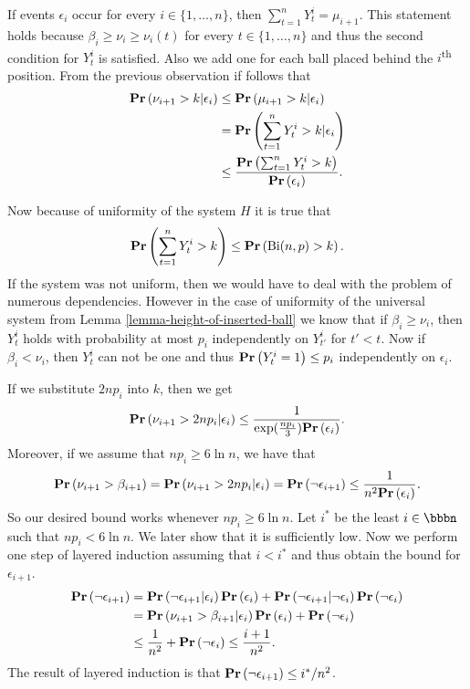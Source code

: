 \documentclass[runningheads,a4paper]{llncs}
\begin{document}
If events $\epsilon_i$ occur for every $i \in \{1, \dots, n\}$, then $\sum_{t = 1}^{n} Y_t^i = \mu_{i + 1}$. This statement holds because $\beta_i \geq \nu_i \geq \nu_i(t)$ for every $t \in \{1, \dots, n\}$ and thus the second condition for $Y_t^i$ is satisfied. Also we add one for each ball placed behind the $i$\textsuperscript{th} position. 
From the previous observation if follows that
\[
\begin{split}
\mathbf{Pr}\left(\nu_{i + 1} > k | \epsilon_i\right) 
	& \leq \mathbf{Pr}\left(\mu_{i + 1} > k | \epsilon_i\right) \\
	& = \mathbf{Pr}\left(\displaystyle\sum_{t = 1}^{n} Y_t^{i} > k | \epsilon_i\right) \\
	& \leq \frac{\mathbf{Pr}\left(\sum_{t = 1}^{n} Y_t^{i} > k\right)}{\mathbf{Pr}\left(\epsilon_i\right)}. \\
\end{split}
\]

Now because of uniformity of the system $H$ it is true that $$\mathbf{Pr}\left(\sum_{t = 1}^{n} Y_t^i > k\right) \leq \mathbf{Pr}\left(\mathrm{Bi}(n, p) > k\right).$$ If the system was not uniform, then we would have to deal with the problem of numerous dependencies. However in the case of uniformity of the universal system from Lemma \ref{lemma-height-of-inserted-ball} we know that if $\beta_i \geq \nu_i$, then $Y_t^i$ holds with probability at most $p_i$ independently on $Y_{t'}^i$ for $t' < t$. Now if $\beta_i < \nu_i$, then $Y_t^i$ can not be one and thus $\mathbf{Pr}\left(Y_t^i = 1\right) \leq p_i$ independently on $\epsilon_i$.

If we substitute $2np_i$ into $k$, then we get
\[
\mathbf{Pr}\left(\nu_{i + 1} > 2np_i | \epsilon_i\right) \leq \frac{1}{\exp(\frac{np_i}{3})\mathbf{Pr}\left(\epsilon_i\right)}.
\]
Moreover, if we assume that $np_i \geq 6 \ln n$, we have that 
\[
\mathbf{Pr}\left(\nu_{i + 1} > \beta_{i + 1}\right) = \mathbf{Pr}\left(\nu_{i + 1} > 2np_i | \epsilon_i\right) = \mathbf{Pr}\left(\neg \epsilon_{i + 1}\right) \leq \frac{1}{n ^ 2\mathbf{Pr}\left(\epsilon_i\right)} \textit{.}
\]
So our desired bound works whenever $np_i \geq 6 \ln n$. Let $i^*$ be the least $i \in \bbbn$ such that $np_i < 6 \ln n$. We later show that it is sufficiently low. Now we perform one step of layered induction assuming that $i<i^*$ and thus obtain the bound for $\epsilon_{i + 1}$.
\[
\begin{split}
\mathbf{Pr}\left(\neg \epsilon_{i + 1}\right) 
	& = \mathbf{Pr}\left(\neg \epsilon_{i + 1} | \epsilon_i\right)\mathbf{Pr}\left(\epsilon_i\right) + \mathbf{Pr}\left(\neg \epsilon_{i + 1} | \neg \epsilon_i\right)\mathbf{Pr}\left(\neg \epsilon_i\right) \\
	& = \mathbf{Pr}\left(\nu_{i + 1} > \beta_{i + 1} | \epsilon_i\right)\mathbf{Pr}\left(\epsilon_i\right) + \mathbf{Pr}\left(\neg \epsilon_i\right) \\
	& \leq \frac{1}{n ^ 2} + \mathbf{Pr}\left(\neg \epsilon_i\right) \leq \frac{i + 1}{n ^ 2} \textit{.}
\end{split} 
\]
The result of layered induction is that $\mathbf{Pr}\left(\neg \epsilon_{i + 1}\right) \leq i^* / n^2$. 
\end{document}
